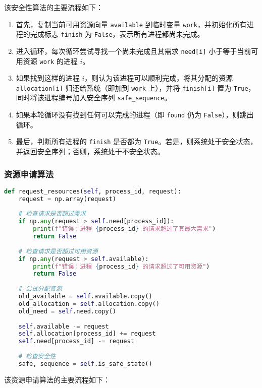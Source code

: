 \documentclass[12pt, a4paper, oneside]{ctexart}
\begin{document}
该安全性算法的主要流程如下：

\begin{enumerate}
    \item 首先，复制当前可用资源向量 \texttt{available} 到临时变量 \texttt{work}，并初始化所有进程的完成标志 \texttt{finish} 为 \texttt{False}，表示所有进程都尚未完成。
    \item 进入循环，每次循环尝试寻找一个尚未完成且其需求 \texttt{need[i]} 小于等于当前可用资源 \texttt{work} 的进程 $i$。
    \item 如果找到这样的进程 $i$，则认为该进程可以顺利完成，将其分配的资源 \texttt{allocation[i]} 归还给系统（即加到 \texttt{work} 上），并将 \texttt{finish[i]} 置为 \texttt{True}，同时将该进程编号加入安全序列 \texttt{safe\_sequence}。
    \item 如果本轮循环没有找到任何可以完成的进程（即 \texttt{found} 仍为 \texttt{False}），则跳出循环。
    \item 最后，判断所有进程的 \texttt{finish} 是否都为 \texttt{True}。若是，则系统处于安全状态，并返回安全序列；否则，系统处于不安全状态。
\end{enumerate}

\subsubsection{资源申请算法}

\begin{lstlisting}[language=Python, caption=资源申请算法代码]
def request_resources(self, process_id, request): 
    request = np.array(request)
    
    # 检查请求是否超过需求
    if np.any(request > self.need[process_id]):
        print(f"错误：进程 {process_id} 的请求超过了其最大需求")
        return False
        
    # 检查请求是否超过可用资源
    if np.any(request > self.available):
        print(f"错误：进程 {process_id} 的请求超过了可用资源")
        return False
        
    # 尝试分配资源
    old_available = self.available.copy()
    old_allocation = self.allocation.copy()
    old_need = self.need.copy()
    
    self.available -= request
    self.allocation[process_id] += request
    self.need[process_id] -= request
    
    # 检查安全性
    safe, sequence = self.is_safe_state()  
\end{lstlisting}

该资源申请算法的主要流程如下：
\end{document}
